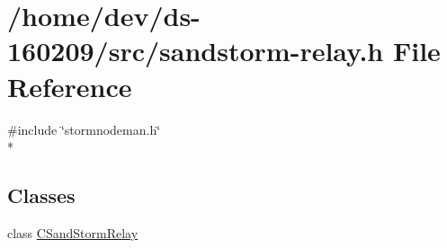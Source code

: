 \hypertarget{sandstorm-relay_8h}{}\section{/home/dev/ds-\/160209/src/sandstorm-\/relay.h File Reference}
\label{sandstorm-relay_8h}
{\ttfamily \#include \char`\"{}stormnodeman.\+h\char`\"{}}\\*
\subsection*{Classes}
\begin{DoxyCompactItemize}
\item 
class \hyperlink{class_c_sand_storm_relay}{C\+Sand\+Storm\+Relay}
\end{DoxyCompactItemize}
